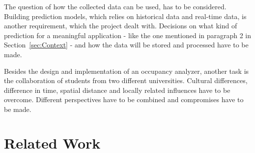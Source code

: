 The question of how the collected data can be used, has to be considered. Building prediction models, which relies on historical data and real-time data, is another requirement, which the project dealt with. Decisions on what kind of prediction for a meaningful application - like the one mentioned in paragraph 2 in Section~\ref{sec:Context} - and how the data will be stored and processed have to be made.

Besides the design and implementation of an occupancy analyzer, another task is the collaboration of students from two different universities. Cultural differences, difference in time, spatial distance and locally related influences have to be overcome. Different perspectives have to be combined and compromises have to be made.

\section{Related Work}






